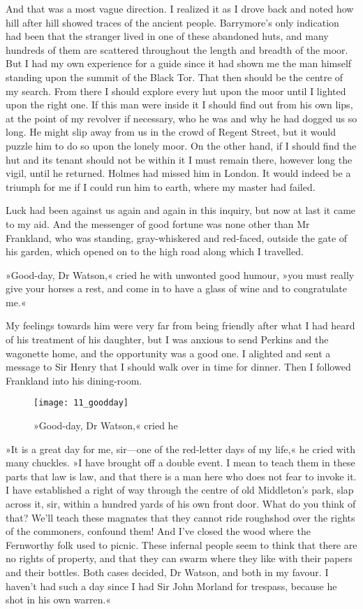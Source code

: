 And that was a most vague direction. I realized it as I drove back and noted how hill after hill showed traces of the ancient people. Barrymore's only indication had been that the stranger lived in one of these abandoned huts, and many hundreds of them are scattered throughout the length and breadth of the moor. But I had my own experience for a guide since it had shown me the man himself standing upon the summit of the Black Tor. That then should be the centre of my search. From there I should explore every hut upon the moor until I lighted upon the right one. If this man were inside it I should find out from his own lips, at the point of my revolver if necessary, who he was and why he had dogged us so long. He might slip away from us in the crowd of Regent Street, but it would puzzle him to do so upon the lonely moor. On the other hand, if I should find the hut and its tenant should not be within it I must remain there, however long the vigil, until he returned. Holmes had missed him in London. It would indeed be a triumph for me if I could run him to earth, where my master had failed.

Luck had been against us again and again in this inquiry, but now at last it came to my aid. And the messenger of good fortune was none other than Mr Frankland, who was standing, gray-whiskered and red-faced, outside the gate of his garden, which opened on to the high road along which I travelled.

»Good-day, Dr Watson,« cried he with unwonted good hum\-our, »you must really give your horses a rest, and come in to have a glass of wine and to congratulate me.«

My feelings towards him were very far from being friendly after what I had heard of his treatment of his daughter, but I was anxious to send Perkins and the wagonette home, and the opportunity was a good one. I alighted and sent a message to Sir Henry that I should walk over in time for dinner. Then I followed Frankland into his dining-room.

\begin{figure}[tbh]
\centering
\texttt{[image: 11\_goodday]}
\caption{»Good-day, Dr Watson,« cried he}
\end{figure}

»It is a great day for me, sir\allowbreak---\allowbreak one of the red-letter days of my life,« he cried with many chuckles. »I have brought off a double event. I mean to teach them in these parts that law is law, and that there is a man here who does not fear to invoke it. I have established a right of way through the centre of old Middleton's park, slap across it, sir, within a hundred yards of his own front door. What do you think of that? We'll teach these magnates that they cannot ride roughshod over the rights of the commoners, confound them! And I've closed the wood where the Fernworthy folk used to picnic. These infernal people seem to think that there are no rights of property, and that they can swarm where they like with their papers and their bottles. Both cases decided, Dr Watson, and both in my favour. I haven't had such a day since I had Sir John Morland for trespass, because he shot in his own warren.«

